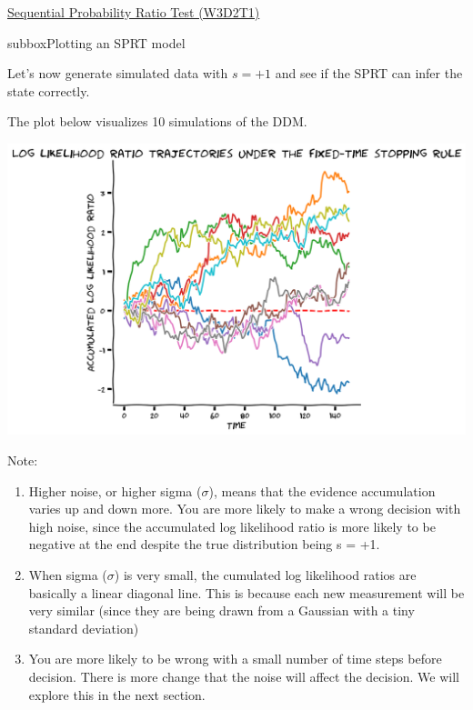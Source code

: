 \begin{textbox}{\href{https://compneuro.neuromatch.io/tutorials/W3D2_HiddenDynamics/student/W3D2_Tutorial1.html}{Sequential Probability Ratio Test (W3D2T1)}   }

\begin{subbox}{subbox}{Plotting an SPRT model}
\scriptsize


Let's now generate simulated data with $s=+1$ and see if the SPRT can infer the state correctly.

The plot below visualizes 10 simulations of the DDM.
\begin{center}
    
\includegraphics[scale=0.25]{Figures/HD/HD_Figure1.png}
\end{center}
Note:
\begin{enumerate}
    \item 
Higher noise, or higher sigma ($\sigma$), means that the evidence accumulation varies up
   and down more. You are more likely to make a wrong decision with high noise,
   since the accumulated log likelihood ratio is more likely to be negative at the end
   despite the true distribution being s = +1.

\item When sigma ($\sigma$) is very small, the cumulated log likelihood ratios are basically a linear
   diagonal line. This is because each new measurement will be very similar (since they are
   being drawn from a Gaussian with a tiny standard deviation)

\item You are more likely to be wrong with a small number of time steps before decision. There is
   more change that the noise will affect the decision. We will explore this in the next section.
\end{enumerate}

\end{subbox}
\end{textbox}

